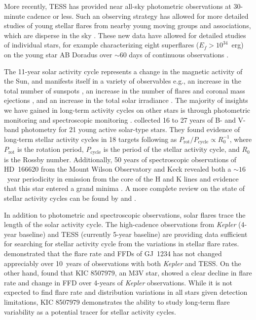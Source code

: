 \documentclass[twocolumn]{aastex631}
\begin{document}
More recently, TESS \citep{ricker15} has provided near all-sky photometric observations at 30-minute cadence or less. Such an observing strategy has allowed for more detailed studies of young stellar flares from nearby young moving groups and associations, which are disperse in the sky \citep{gagne18}. These new data have allowed for detailed studies of individual stars, for example characterizing eight superflares ($E_f > 10^{34}$~erg) on the young star AB Doradus over $\sim 60$ days of continuous observations \citep{schmitt19}.

The 11-year solar activity cycle represents a change in the magnetic activity of the Sun, and manifests itself in a variety of observables e.g., an increase in the total number of sunspots \citep{clette14, kilcik14}, an increase in the number of flares and coronal mass ejections \citep{crossby93, webb94, lin23}, and an increase in the total solar irradiance \citep{lean1987}. The majority of insights we have gained in long-term activity cycles on other stars is through photometric monitoring and spectroscopic monitoring \citep{saar99}. \cite{lehtinen16} collected 16 to 27 years of B- and V-band photometry for 21 young active solar-type stars. They found evidence of long-term stellar activity cycles in 18 targets following as $P_\textrm{rot}/P_\textrm{cycle} \propto R_0^{-1}$, where $P_\textrm{rot}$ is the rotation period, $P_\textrm{cycle}$ is the period of the stellar activity cycle, and $R_0$ is the Rossby number. Additionally, 50 years of spectroscopic observations of HD~166620 from the Mount Wilson Observatory and Keck revealed both a $\sim 16$~year periodicity in emission from the core of the  H and K lines \citep{olah16} and evidence that this star entered a grand minima \citep{baum22}. A more complete review on the state of stellar activity cycles can be found by \cite{jeffers23} and \cite{isik23}.

In addition to photometric and spectroscopic observations, solar flares trace the length of the solar activity cycle. The high-cadence observations from \textit{Kepler} (4-year baseline) and TESS (currently 5-year baseline) are providing data sufficient for searching for stellar activity cycle from the variations in stellar flare rates. \cite{davenport20} demonstrated that the flare rate and FFDs of GJ~1234 has not changed appreciably over 10~years of observations with both \textit{Kepler} and TESS. On the other hand, \cite{scoggins19} found that  KIC 8507979, an M3V star, showed a clear decline in flare rate and change in FFD over 4-years of \textit{Kepler} observations. While it is not expected to find flare rate and distribution variations in all stars given detection limitations, KIC 8507979 demonstrates the ability to study long-term flare variability as a potential tracer for stellar activity cycles.
\end{document}
